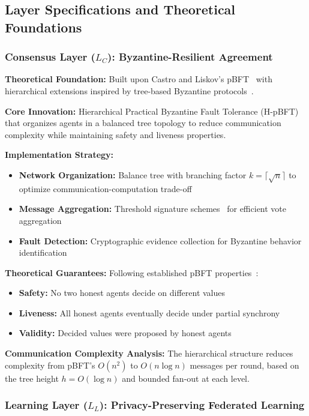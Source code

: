 \documentclass[conference]{IEEEtran}
\begin{document}
\subsection{Layer Specifications and Theoretical Foundations}

\subsubsection{Consensus Layer ($L_C$): Byzantine-Resilient Agreement}

\textbf{Theoretical Foundation:} Built upon Castro and Liskov's pBFT~\cite{castro1999practical} with hierarchical extensions inspired by tree-based Byzantine protocols~\cite{bracha1987asynchronous}.

\textbf{Core Innovation:} Hierarchical Practical Byzantine Fault Tolerance (H-pBFT) that organizes agents in a balanced tree topology to reduce communication complexity while maintaining safety and liveness properties.

\textbf{Implementation Strategy:} 
\begin{itemize}
    \item \textbf{Network Organization:} Balance tree with branching factor $k = \lceil\sqrt{n}\rceil$ to optimize communication-computation trade-off
    \item \textbf{Message Aggregation:} Threshold signature schemes~\cite{boneh2001short} for efficient vote aggregation
    \item \textbf{Fault Detection:} Cryptographic evidence collection for Byzantine behavior identification
\end{itemize}

\textbf{Theoretical Guarantees:} Following established pBFT properties~\cite{castro1999practical}:
\begin{itemize}
    \item \textbf{Safety:} No two honest agents decide on different values
    \item \textbf{Liveness:} All honest agents eventually decide under partial synchrony
    \item \textbf{Validity:} Decided values were proposed by honest agents
\end{itemize}

\textbf{Communication Complexity Analysis:} The hierarchical structure reduces complexity from pBFT's $O(n^2)$ to $O(n \log n)$ messages per round, based on the tree height $h = O(\log n)$ and bounded fan-out at each level.

\subsubsection{Learning Layer ($L_L$): Privacy-Preserving Federated Learning}
\end{document}
